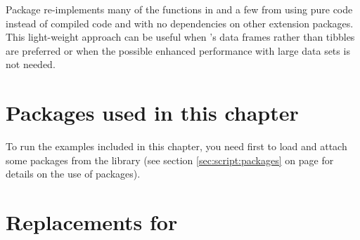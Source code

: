 \documentclass[krantz2]{krantz}\usepackage{knitr}
\begin{document}
\begin{infobox}
Package  re-implements many of the functions in  and a few from  using pure \Rlang code instead of compiled \Cpplang code and with no dependencies on other extension packages. This light-weight approach can be useful when \Rlang's data frames rather than tibbles are preferred or when the possible enhanced performance with large data sets is not needed.
\end{infobox}

\section{Packages used in this chapter}

\begin{knitrout}\footnotesize
{}\color{fgcolor}\begin{kframe}
\begin{alltt}
\hlopt{::}
\end{alltt}
\end{kframe}
\end{knitrout}

To run the examples included in this chapter, you need first to load and attach some packages from the library (see section \ref{sec:script:packages} on page \pageref{sec:script:packages} for details on the use of packages).

\begin{knitrout}\footnotesize
{}\color{fgcolor}\begin{kframe}
\begin{alltt}
\end{alltt}
\end{kframe}
\end{knitrout}

\section[Replacements for \texttt{data.frame}]{Replacements for }
\end{document}
